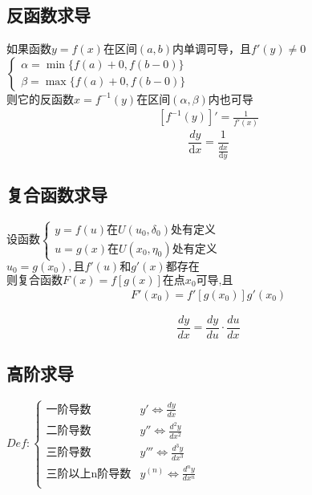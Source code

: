 \subsection{反函数求导}
如果函数$y=f(x)$在区间$(a,b)$内单调可导，且$f'(y)\neq 0$\\
$\begin{cases}
  \alpha=\min\{f(a)+0,f(b-0)\}\\
  \beta=\max\{f(a)+0,f(b-0)\}
\end{cases}$\\
则它的反函数$x=f^{-1}(y)$在区间$(\alpha,\beta)$内也可导
\begin{align}
  \left[f^{-1}(y)\right]'=\frac{1}{f'(x)} \label{derivative_of_inverse_function}
\end{align}
$$\frac{dy}{\mathrm{d}{x}}=\frac{1}{\frac{dx}{\mathrm{d}{y}}}$$
\subsection{复合函数求导}
\begin{center}
  设函数$\begin{cases}
    y=f(u)\mbox{在}U(u_0,\delta_0)\mbox{处有定义}\\
    u=g(x)\mbox{在}U(x_0,\eta_0)\mbox{处有定义}
  \end{cases}$\\
  $u_0=g(x_0),\mbox{且}f'(u)\mbox{和}g'(x)\mbox{都存在}$\\
  $\mbox{则复合函数}F(x)=f\left[g(x)\right]\mbox{在点}x_0\mbox{可导,且}$
  \begin{align}
    F'(x_0)=f'\left[g(x_0)\right]g'(x_0)\label{derivative_of_composite_functions}
  \end{align}
\end{center}
$$\frac{dy}{dx}=\frac{dy}{du}\cdot\frac{du}{dx}$$
\subsection{高阶求导}
$Def:\begin{cases}
  \mbox{一阶导数} &y'\Leftrightarrow \frac{dy}{dx}\\
  \mbox{二阶导数}&y''\Leftrightarrow \frac{d^2y}{dx^2}\\
  \mbox{三阶导数}&y'''\Leftrightarrow \frac{d^3y}{dx^3}\\
  \mbox{三阶以上n阶导数}&y^{(n)}\Leftrightarrow \frac{d^ny}{dx^n}\\
\end{cases}$
